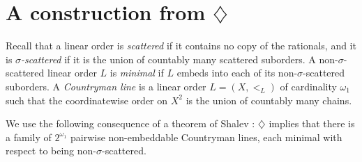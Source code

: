 \documentclass[10pt,a4paper]{amsart}
\numberwithin{equation}{section}
\theoremstyle{definition}
\theoremstyle{remark}
\begin{document}
\section{A construction from $\diamondsuit$}

Recall that a linear order is \emph{scattered} if it contains no copy
of the rationals, and it is \emph{$\sigma$-scattered} if it is the
union of countably many scattered suborders.  A non-$\sigma$-scattered
linear order $L$ is \emph{minimal} if $L$ embeds into each of its
non-$\sigma$-scattered suborders.  A \emph{Countryman line} is a linear
order $L=(X,<_{L})$ of cardinality $\omega_1$ such that the
coordinatewise order on $X^2$ is the union of countably many chains.

We use the following consequence of a theorem of Shalev
\cite[Corollary~1.2 and Remark~1.3]{Shalev2024}: $\diamondsuit$ implies
that there is a family of $2^{\omega_1}$ pairwise non-embeddable
Countryman lines, each minimal with respect to being
non-$\sigma$-scattered.
\end{document}
